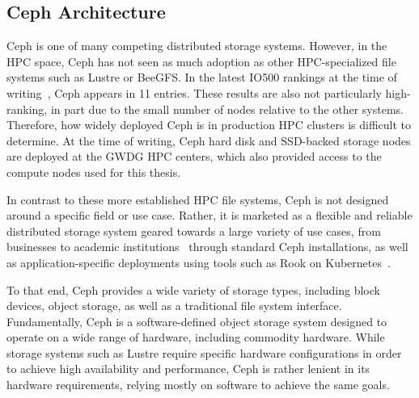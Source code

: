 \subsection{Ceph Architecture}
\label{ceph-arch}

Ceph is one of many competing distributed storage systems. However, in the \ac{HPC} space, Ceph has not seen as much adoption as other \acs{HPC}-specialized file systems such as Lustre or BeeGFS. In the latest IO500 rankings at the time of writing~\cite{io500-full-list}, Ceph appears in 11 entries. These results are also not particularly high-ranking, in part due to the small number of nodes relative to the other systems. Therefore, how widely deployed Ceph is in production \ac{HPC} clusters is difficult to determine. At the time of writing, Ceph hard disk and \ac{SSD}-backed storage nodes are deployed at the \ac{GWDG} \ac{HPC} centers, which also provided access to the compute nodes used for this thesis.

In contrast to these more established \ac{HPC} file systems, Ceph is not designed around a specific field or use case. Rather, it is marketed as a flexible and reliable distributed storage system geared towards a large variety of use cases, from businesses to academic institutions~\cite{ceph-use-cases} through standard Ceph installations, as well as application-specific deployments using tools such as Rook on Kubernetes~\cite{rook-doc-home}.

To that end, Ceph provides a wide variety of storage types, including block devices, object storage, as well as a traditional file system interface. Fundamentally, Ceph is a software-defined object storage system designed to operate on a wide range of hardware, including commodity hardware. While storage systems such as Lustre require specific hardware configurations in order to achieve high availability and performance, Ceph is rather lenient in its hardware requirements, relying mostly on software to achieve the same goals.


